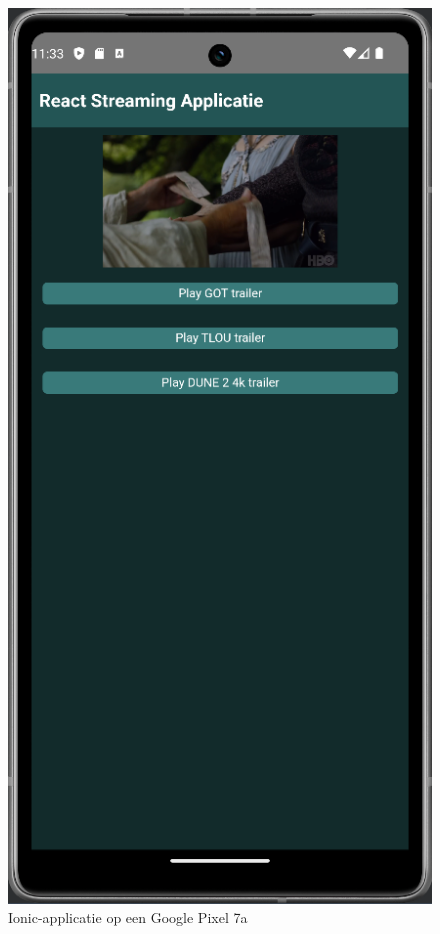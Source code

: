 \begin{figure}
  \centering
  \includegraphics[width=0.7\linewidth]{img/ReactIonicPhone}
  \caption{Ionic-applicatie op een Google Pixel 7a}
  \label{fig:Ionic-applicatie op een Google Pixel 7a}
\end{figure}

